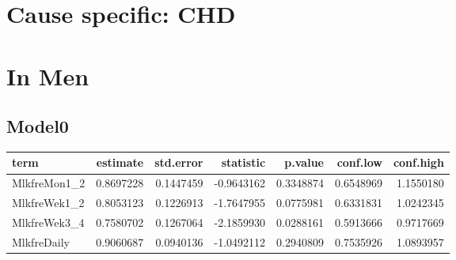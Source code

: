 \documentclass[
]{article}
\newenvironment{Shaded}{\begin{snugshade}}{\end{snugshade}}
\newcommand{\CommentTok}[1]{\textcolor[rgb]{0.56,0.35,0.01}{\textit{#1}}}
\newcommand{\DataTypeTok}[1]{\textcolor[rgb]{0.13,0.29,0.53}{#1}}
\newcommand{\KeywordTok}[1]{\textcolor[rgb]{0.13,0.29,0.53}{\textbf{#1}}}
\newcommand{\NormalTok}[1]{#1}
\newcommand{\OperatorTok}[1]{\textcolor[rgb]{0.81,0.36,0.00}{\textbf{#1}}}
\newcommand{\OtherTok}[1]{\textcolor[rgb]{0.56,0.35,0.01}{#1}}
\newcommand{\StringTok}[1]{\textcolor[rgb]{0.31,0.60,0.02}{#1}}
\begin{document}
\hypertarget{cause-specific-chd}{%
\section{Cause specific: CHD}\label{cause-specific-chd}}

\begin{Shaded}
\end{Shaded}

\hypertarget{in-men-3}{%
\section{In Men}\label{in-men-3}}

\hypertarget{model0-7}{%
\subsection{Model0}\label{model0-7}}

\begin{Shaded}
\end{Shaded}

\begin{longtable}[]{@{}lrrrrrr@{}}
\toprule
term & estimate & std.error & statistic & p.value & conf.low &
conf.high\tabularnewline
\midrule
\endhead
MlkfreMon1\_2 & 0.8697228 & 0.1447459 & -0.9643162 & 0.3348874 &
0.6548969 & 1.1550180\tabularnewline
MlkfreWek1\_2 & 0.8053123 & 0.1226913 & -1.7647955 & 0.0775981 &
0.6331831 & 1.0242345\tabularnewline
MlkfreWek3\_4 & 0.7580702 & 0.1267064 & -2.1859930 & 0.0288161 &
0.5913666 & 0.9717669\tabularnewline
MlkfreDaily & 0.9060687 & 0.0940136 & -1.0492112 & 0.2940809 & 0.7535926
& 1.0893957\tabularnewline
\bottomrule
\end{longtable}
\end{document}
